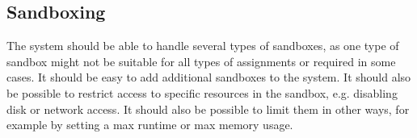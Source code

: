 \subsection{Sandboxing}
The system should be able to handle several types of sandboxes, as one type of sandbox
might not be suitable for all types of assignments or required in some cases. It should
be easy to add additional sandboxes to the system. It should also be possible to restrict access to
specific resources in the sandbox, e.g. disabling disk or network access.
It should also be possible to limit them in other ways, for example by setting
a max runtime or max memory usage.
